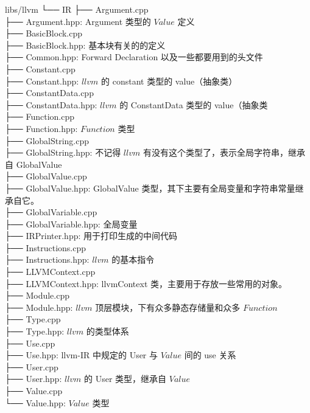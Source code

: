 \documentclass[a4paper]{article}
\begin{document}
			\begin{algorithm}[H]
				libs/llvm
				└── IR
				├── Argument.cpp \\
				├── Argument.hpp: Argument 类型的 $Value$ 定义 \\
				├── BasicBlock.cpp \\
				├── BasicBlock.hpp: 基本块有关的的定义 \\
				├── Common.hpp: Forward Declaration 以及一些都要用到的头文件 \\
				├── Constant.cpp \\
				├── Constant.hpp: $llvm$ 的 constant 类型的 value（抽象类） \\
				├── ConstantData.cpp \\
				├── ConstantData.hpp: $llvm$ 的 ConstantData 类型的 value（抽象类 \\
				├── Function.cpp \\
				├── Function.hpp: $Function$ 类型 \\
				├── GlobalString.cpp \\
				├── GlobalString.hpp: 不记得 $llvm$ 有没有这个类型了，表示全局字符串，继承自 GlobalValue \\
				├── GlobalValue.cpp \\
				├── GlobalValue.hpp: GlobalValue 类型，其下主要有全局变量和字符串常量继承自它。 \\
				├── GlobalVariable.cpp \\
				├── GlobalVariable.hpp: 全局变量 \\
				├── IRPrinter.hpp: 用于打印生成的中间代码 \\
				├── Instructions.cpp \\
				├── Instructions.hpp: $llvm$ 的基本指令 \\
				├── LLVMContext.cpp \\
				├── LLVMContext.hpp: llvmContext 类，主要用于存放一些常用的对象。 \\
				├── Module.cpp \\
				├── Module.hpp: $llvm$ 顶层模块，下有众多静态存储量和众多 $Function$ \\
				├── Type.cpp \\
				├── Type.hpp: $llvm$ 的类型体系 \\
				├── Use.cpp \\
				├── Use.hpp: llvm-IR 中规定的 User 与 $Value$ 间的 use 关系 \\
				├── User.cpp \\
				├── User.hpp: $llvm$ 的 User 类型，继承自 $Value$ \\
				├── Value.cpp \\
				└── Value.hpp: $Value$ 类型
			\end{algorithm}
		
\end{document}
